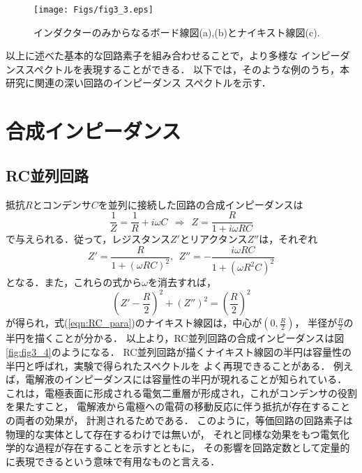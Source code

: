 \begin{figure}[h]
	\begin{center}
	\texttt{[image: Figs/fig3\_3.eps]} 
	\end{center}
	\caption{
		インダクターのみからなるボード線図(a),(b)とナイキスト線図(c).
	} 
	\label{fig:fig3_3}
\end{figure}
以上に述べた基本的な回路素子を組み合わせることで，より多様な
インピーダンススペクトルを表現することができる．
以下では，そのような例のうち，本研究に関連の深い回路のインピーダンス
スペクトルを示す．
\section{合成インピーダンス}
\subsection{RC並列回路}
抵抗$R$とコンデンサ$C$を並列に接続した回路の合成インピーダンスは
\begin{equation}
	\frac{1}{Z}=\frac{1}{R} + i\omega C \ \ 
	\Rightarrow \ \ Z =\frac{R}{1+i\omega RC}
	\label{eqn:RC_para}
\end{equation}
で与えられる．従って，レジスタンス$Z'$とリアクタンス$Z''$は，それぞれ
\begin{equation}
	Z'=\frac{R}{1+(\omega RC)^2}, \ \ 
	Z''=-\frac{i\omega RC}{1+(\omega R^2C)^2} 
	\label{eqn:}
\end{equation}
となる．また，これらの式から$\omega$を消去すれば，
\begin{equation}
	\left( Z'-\frac{R}{2}\right)^2 +\left(Z''\right)^2 =\left( \frac{R}{2}\right)^2
	\label{eqn:}
\end{equation}
が得られ，式(\ref{eqn:RC_para})のナイキスト線図は，中心が$\left( 0, \frac{R}{2}\right)$，
半径が$\frac{R}{2}$の半円を描くことが分かる．
以上より，RC並列回路の合成インピーダンスは図\ref{fig:fig3_4}のようになる．
RC並列回路が描くナイキスト線図の半円は容量性の半円と呼ばれ，実験で得られたスペクトルを
よく再現できることがある．
例えば，電解液のインピーダンスには容量性の半円が現れることが知られている．
これは，電極表面に形成される電気二重層が形成され，これがコンデンサの役割を果たすこと，
電解液から電極への電荷の移動反応に伴う抵抗が存在することの両者の効果が，
計測されるためである．
このように，等価回路の回路素子は物理的な実体として存在するわけでは無いが，
それと同様な効果をもつ電気化学的な過程が存在することを示すとともに，
その影響を回路定数として定量的に表現できるという意味で有用なものと言える．
